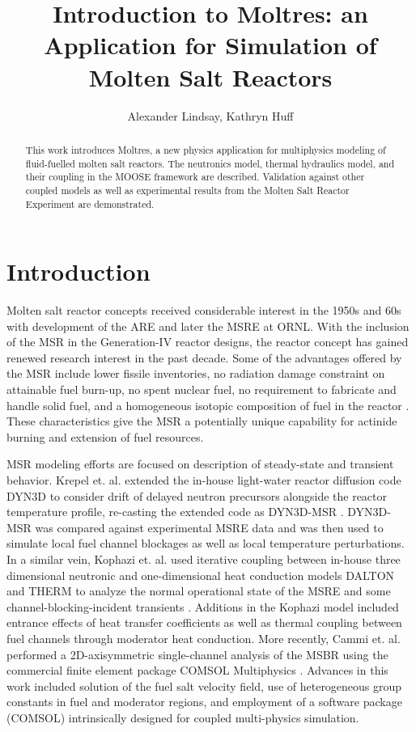 \documentclass{article}
\title{Introduction to Moltres: an Application for Simulation of Molten Salt Reactors}
\author{Alexander Lindsay, Kathryn Huff}
\let\Oldsection\section
\renewcommand{\section}{\FloatBarrier\Oldsection}
\begin{document}
\maketitle

\begin{abstract}
        This work introduces Moltres, a new physics application for multiphysics modeling of 
        fluid-fuelled molten salt reactors. The neutronics model, thermal 
        hydraulics model, and their coupling in the MOOSE framework are 
        described. Validation against other coupled models as well as experimental 
        results from the Molten Salt Reactor Experiment are demonstrated.
\end{abstract}

\section{Introduction}

Molten salt reactor concepts received considerable interest
in the 1950s and 60s with development of the \gls{ARE} and
later the \gls{MSRE} at \gls{ORNL}. With the inclusion of the \gls{MSR} in the
Generation-IV reactor designs, the reactor concept has gained renewed research
interest in the past decade. Some of the advantages offered by the \gls{MSR}
include lower fissile inventories, no radiation damage constraint on attainable
fuel burn-up, no spent nuclear fuel, no requirement to fabricate and handle
solid fuel, and a homogeneous isotopic composition of fuel in the
reactor \cite{noauthor_gen_2008}. These characteristics give the \gls{MSR} a
potentially unique capability for actinide burning and extension of fuel
resources.

\gls{MSR} modeling efforts are focused on description of steady-state and
transient behavior. Krepel et. al. extended the in-house light-water reactor
diffusion code DYN3D to consider drift of delayed neutron precursors alongside
the reactor temperature profile, re-casting the extended code as
DYN3D-MSR \cite{krepel_dyn3d-msr_2007}. DYN3D-MSR was compared against
experimental \gls{MSRE} data and was then used to simulate local fuel channel
blockages as well as local temperature perturbations. In a similar vein, Kophazi
et. al. used iterative coupling between in-house three dimensional neutronic and
one-dimensional heat conduction models DALTON and THERM to analyze the normal
operational state of the \gls{MSRE} and some channel-blocking-incident
transients \cite{kophazi_development_2009}. Additions in the Kophazi model
included entrance effects of heat transfer coefficients as well as thermal
coupling between fuel channels through moderator heat conduction. More recently,
Cammi et. al. performed a 2D-axisymmetric single-channel analysis of the
\gls{MSBR} using the commercial finite element package COMSOL
Multiphysics \cite{cammi_multi-physics_2011}. Advances in this work included
solution of the fuel salt velocity field, use of heterogeneous group constants
in fuel and moderator regions, and employment of a software package (COMSOL)
intrinsically designed for coupled multi-physics simulation.
\end{document}
